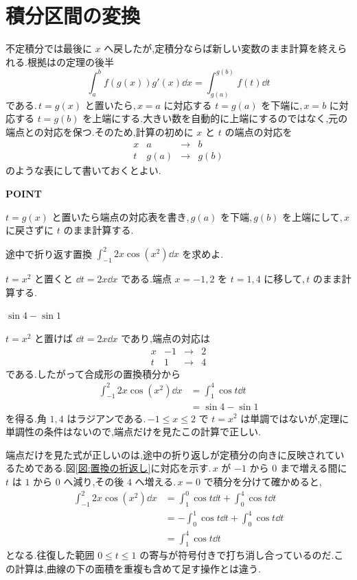 \section{積分区間の変換}\label{節:置換と積分区間}

不定積分では最後に $x$ へ戻したが,定積分ならば新しい変数のまま計算を終えられる.根拠はの定理の後半
\[
 \int_a^b f(g(x))g'(x)\dd x
 =\int_{g(a)}^{g(b)}f(t)\dd t
\]
である.\,$t=g(x)$ と置いたら,\,$x=a$ に対応する $t=g(a)$ を下端に,\,$x=b$ に対応する $t=g(b)$ を上端にする.大きい数を自動的に上端にするのではなく,元の端点との対応を保つ.そのため,計算の初めに $x$ と $t$ の端点の対応を
\[
 \begin{array}{c|ccc}
 x&a&\to&b\\ \hline
 t&g(a)&\to&g(b)
 \end{array}
\]
のような表にして書いておくとよい.

\begin{bookpoint}
\textbf{POINT}\par
$t=g(x)$ と置いたら端点の対応表を書き,\,$g(a)$ を下端,\,$g(b)$ を上端にして,\,$x$ に戻さずに $t$ のまま計算する.
\end{bookpoint}

\begin{example}{途中で折り返す置換}
$\int_{-1}^{2}2x\cos(x^2)\dd x$ を求めよ.
\end{example}

$t=x^2$ と置くと $\dd t=2x\dd x$ である.端点 $x=-1,2$ を $t=1,4$ に移して,\,$t$ のまま計算する.

$\sin4-\sin1$

$t=x^2$ と置けば $\dd t=2x\dd x$ であり,端点の対応は
\[
 \begin{array}{c|ccc}
 x&-1&\to&2\\ \hline
 t&1&\to&4
 \end{array}
\]
である.したがって合成形の置換積分から
\begin{align*}
 \int_{-1}^{2}2x\cos(x^2)\dd x
 &=\int_1^4\cos t\dd t\\
 &=\sin4-\sin1
\end{align*}
を得る.角 $1,4$ はラジアンである.\,$-1\le x\le2$ で $t=x^2$ は単調ではないが,定理に単調性の条件はないので,端点だけを見たこの計算で正しい.

端点だけを見た式が正しいのは,途中の折り返しが定積分の向きに反映されているためである.図\ref{図:置換の折返し}に対応を示す.\,$x$ が $-1$ から $0$ まで増える間に $t$ は $1$ から $0$ へ減り,その後 $4$ へ増える.\,$x=0$ で積分を分けて確かめると,
\begin{align*}
 \int_{-1}^{2}2x\cos(x^2)\dd x
 &=\int_1^0\cos t\dd t+\int_0^4\cos t\dd t\\
 &=-\int_0^1\cos t\dd t+\int_0^4\cos t\dd t\\
 &=\int_1^4\cos t\dd t
\end{align*}
となる.往復した範囲 $0\le t\le1$ の寄与が符号付きで打ち消し合っているのだ.この計算は,曲線の下の面積を重複も含めて足す操作とは違う.

